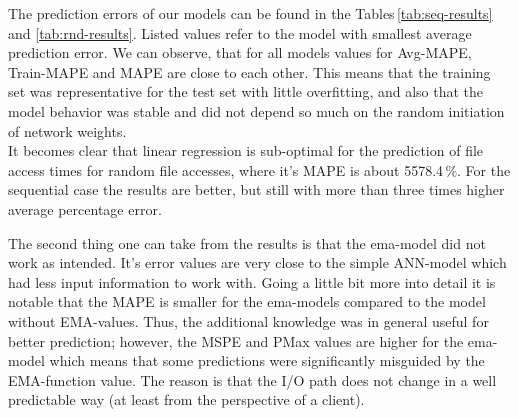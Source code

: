 \documentclass{superfri}
\begin{document}
The prediction errors of our models can be found in the Tables\,\ref{tab:seq-results} and \ref{tab:rnd-results}.
Listed values refer to the model with smallest average prediction error.
We can observe, that for all models values for Avg-MAPE, Train-MAPE and MAPE are close to each other.
This means that the training set was representative for the test set with little overfitting, and also that the model behavior was stable and did not depend so much on the random initiation of network weights.
\\
It becomes clear that linear regression is sub-optimal for the prediction of file access times for random file accesses, where it's MAPE is about 5578.4\,\%. For the sequential case the results are better, but still with more than three times higher average percentage error.\medskip

The second thing one can take from the results is that the ema-model did not work as intended.
It's error values are very close to the simple ANN-model which had less input information to work with.
Going a little bit more into detail it is notable that the MAPE is smaller for the ema-models compared to the model without EMA-values.
Thus, the additional knowledge was in general useful for better prediction; however, the MSPE and PMax values are higher for the ema-model which means that some predictions were significantly misguided by the EMA-function value.
The reason is that the I/O path does not change in a well predictable way (at least from the perspective of a client).
\medskip
\end{document}
